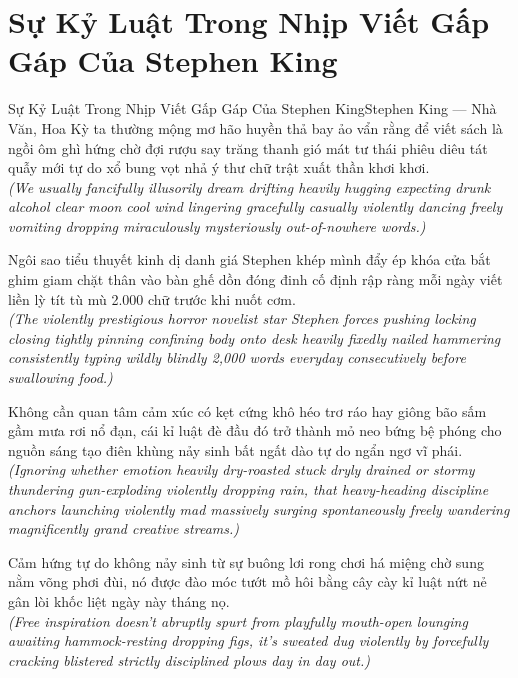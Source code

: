 \section{Sự Kỷ Luật Trong Nhịp Viết Gấp Gáp Của Stephen King}
\begin{truyen}{Sự Kỷ Luật Trong Nhịp Viết Gấp Gáp Của Stephen King}{Stephen King --- Nhà Văn, Hoa Kỳ}
 ta thường mộng mơ hão huyền thả bay ảo vẩn rằng để viết sách là ngồi ôm ghì hứng chờ đợi rượu say trăng thanh gió mát tư thái phiêu diêu tát quẫy mới tự do xổ bung vọt nhả ý thư chữ trật xuất thần khơi khơi.\\[4pt]
\textit{(We usually fancifully illusorily dream drifting heavily hugging expecting drunk alcohol clear moon cool wind lingering gracefully casually violently dancing freely vomiting dropping miraculously mysteriously out-of-nowhere words.)}

Ngôi sao tiểu thuyết kinh dị danh giá Stephen khép mình đẩy ép khóa cửa bắt ghim giam chặt thân vào bàn ghế dồn đóng đinh cố định rập ràng mỗi ngày viết liền lỳ tít tù mù 2.000 chữ trước khi nuốt cơm.\\[4pt]
\textit{(The violently prestigious horror novelist star Stephen forces pushing locking closing tightly pinning confining body onto desk heavily fixedly nailed hammering consistently typing wildly blindly 2,000 words everyday consecutively before swallowing food.)}

Không cần quan tâm cảm xúc có kẹt cứng khô héo trơ ráo hay giông bão sấm gầm mưa rơi nổ đạn, cái kỉ luật đè đầu đó trở thành mỏ neo bứng bệ phóng cho nguồn sáng tạo điên khùng nảy sinh bất ngất dào tự do ngẩn ngơ vĩ phái.\\[4pt]
\textit{(Ignoring whether emotion heavily dry-roasted stuck dryly drained or stormy thundering gun-exploding violently dropping rain, that heavy-heading discipline anchors launching violently mad massively surging spontaneously freely wandering magnificently grand creative streams.)}

\end{truyen}
\begin{baihoc}
  Cảm hứng tự do không nảy sinh từ sự buông lơi rong chơi há miệng chờ sung nằm võng phơi đùi, nó được đào móc tướt mồ hôi bằng cây cày kỉ luật nứt nẻ gân lòi khốc liệt ngày này tháng nọ.\\[4pt]
  \textit{(Free inspiration doesn't abruptly spurt from playfully mouth-open lounging awaiting hammock-resting dropping figs, it's sweated dug violently by forcefully cracking blistered strictly disciplined plows day in day out.)}
\end{baihoc}

